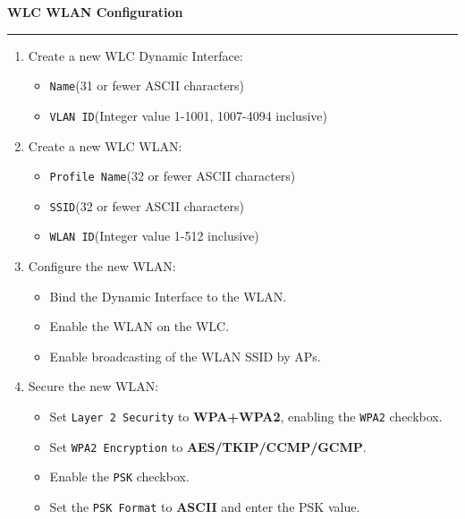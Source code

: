 \documentclass[12pt]{article}
\begin{document}
	\textbf{WLC WLAN Configuration}\hrule
	\begin{enumerate}
		\item{Create a new WLC Dynamic Interface:}
		\begin{itemize} \itemsep -5pt
			\item{\texttt{Name}\hfill(31 or fewer ASCII characters)}
			\item{\texttt{VLAN ID}\hfill(Integer value 1-1001, 1007-4094 inclusive)}
		\end{itemize}
		\item{Create a new WLC WLAN:}
		\begin{itemize} \itemsep -5pt
			\item{\texttt{Profile Name}\hfill(32 or fewer ASCII characters)}
			\item{\texttt{SSID}\hfill(32 or fewer ASCII characters)}
			\item{\texttt{WLAN ID}\hfill(Integer value 1-512 inclusive)}
		\end{itemize}
		\item{Configure the new WLAN:}
		\begin{itemize} \itemsep -5pt
			\item{Bind the Dynamic Interface to the WLAN.}
			\item{Enable the WLAN on the WLC.}
			\item{Enable broadcasting of the WLAN SSID by APs.}
		\end{itemize}
		\item{Secure the new WLAN:}
		\begin{itemize} \itemsep -5pt
			\item{Set \texttt{Layer 2 Security} to \textbf{WPA+WPA2}, enabling the \texttt{WPA2} checkbox.}
			\item{Set \texttt{WPA2 Encryption} to \textbf{AES/TKIP/CCMP/GCMP}.}
			\item{Enable the \texttt{PSK} checkbox.}
			\item{Set the \texttt{PSK Format} to \textbf{ASCII} and enter the PSK value.}
		\end{itemize}
	\end{enumerate}

\end{document}
